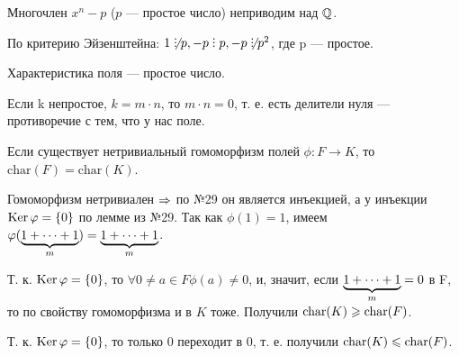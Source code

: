 \begin{solution}
\end{solution}

\begin{problem}
Многочлен $x^n - p$ ($p$ --- простое число) неприводим над $\mathbb{Q}$.
\end{problem}

\begin{solution}
По критерию Эйзенштейна: \(1 \not\Divby p, -p \Divby p, -p \not\Divby p^2\), где p --- простое.
\end{solution}

\begin{problem}[26(6.3)]
Характеристика поля --- простое число.
\end{problem}

\begin{solution}
Если k непростое, \(k=m\cdot n\), то \(m\cdot n = 0\), т. е. есть делители нуля --- противоречие с тем, что у нас поле.
\end{solution}

\begin{problem}
Если существует нетривиальный гомоморфизм полей $\phi: F \to K$, то $\mathrm{char}(F) = \mathrm{char}(K)$.
\end{problem}

\begin{solution}
Гомоморфизм нетривиален $\Rightarrow$ по №29 он является инъекцией, а у инъекции \(\operatorname{Ker} \varphi = \{0\}\) по лемме из №29.
Так как \(\phi(1) = 1\), имеем \(\varphi(\underbrace{1+\dots+1}_{m}) = \underbrace{1+\dots+1}_{m}\). 

Т. к. \(\operatorname{Ker} \varphi = \{0\}\), то $\forall 0 \ne a \in F \phi(a) \ne 0$, и, значит, если \(\underbrace{1+\dots+1}_{m} = 0\) в F, то по свойству гомоморфизма и в $K$ тоже. Получили $\operatorname{char}(K) \geqslant \operatorname{char}(F)$.

Т. к. \(\operatorname{Ker} \varphi = \{0\}\), то только 0 переходит в 0, т. е. получили $\operatorname{char}(K) \leqslant \operatorname{char}(F)$.

\end{solution}

